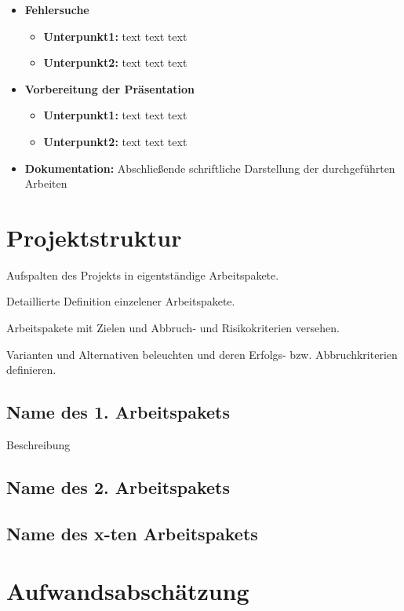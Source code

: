 \documentclass[lang=ngerman,inputenc=utf8,fontsize=10pt]{ldvarticle}
\begin{document}
\begin{itemize}
\begin{itemize}
		\end{itemize}
	\item \textbf{Fehlersuche}  
		\begin{itemize}
			\item \textbf{Unterpunkt1:} text text text
			\item \textbf{Unterpunkt2:} text text text
		\end{itemize}
	\item \textbf{Vorbereitung der Präsentation}  
		\begin{itemize}
			\item \textbf{Unterpunkt1:} text text text
			\item \textbf{Unterpunkt2:} text text text
		\end{itemize}
	\item \textbf{Dokumentation:} Abschließende schriftliche Darstellung der durchgeführten Arbeiten
\end{itemize}

\section{Projektstruktur}

Aufspalten des Projekts in eigentständige Arbeitspakete.

Detaillierte Definition einzelener Arbeitspakete.

Arbeitspakete mit Zielen und Abbruch- und Risikokriterien versehen.

Varianten und Alternativen beleuchten und deren Erfolgs- bzw. Abbruchkriterien definieren.

\subsection*{Name des 1. Arbeitspakets}

Beschreibung

\subsection*{Name des 2. Arbeitspakets}

\subsection*{Name des x-ten Arbeitspakets}


\section{Aufwandsabschätzung}
\end{document}
